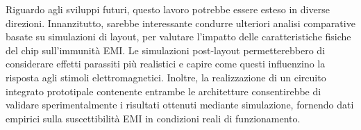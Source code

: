 Riguardo agli sviluppi futuri, questo lavoro potrebbe essere esteso in diverse direzioni. Innanzitutto, sarebbe interessante condurre ulteriori analisi comparative basate su simulazioni di layout, per valutare l'impatto delle caratteristiche fisiche del chip sull'immunità EMI. Le simulazioni post-layout permetterebbero di considerare effetti parassiti più realistici e capire come questi influenzino la risposta agli stimoli elettromagnetici. Inoltre, la realizzazione di un circuito integrato prototipale contenente entrambe le architetture consentirebbe di validare sperimentalmente i risultati ottenuti mediante simulazione, fornendo dati empirici sulla suscettibilità EMI in condizioni reali di funzionamento.
